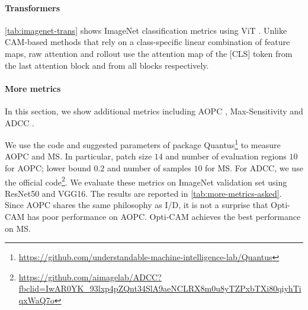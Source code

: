 

\paragraph{Transformers}

\autoref{tab:imagenet-trans} shows ImageNet classification metrics using ViT . 
Unlike CAM-based methods that rely on a class-specific linear combination of feature maps, 
raw attention \autocite{dosovitskiy2020image} and rollout \autocite{abnar2020quantifying} use the 
attention map of the [CLS] token from the last attention block and from all blocks respectively. 

\paragraph{More metrics}
In this section, we show additional metrics including AOPC \autocite{samek2016evaluating}, Max-Sensitivity
 \autocite{yeh2019fidelity} and ADCC \autocite{poppi2021revisiting}.

We use the code and suggested parameters of package 
Quantus\footnote{\url{https://github.com/understandable-machine-intelligence-lab/Quantus}} to measure AOPC 
and MS. In particular, patch size $14$ and number of evaluation regions $10$ for AOPC; lower bound $0.2$ 
and number of samples $10$ for MS.
For ADCC, we use the official 
code\footnote{\url{https://github.com/aimagelab/ADCC?fbclid=IwAR0YK_93lxp4pZQnt34SlA9aeNCLRX8m0u8yTZPxbTXi80qiyhTiqxWaQ7o}}.
We evaluate these metrics on ImageNet validation set using ResNet50 and VGG16. The results are 
reported in \autoref{tab:more-metrics-asked}. Since AOPC shares the same philosophy as I/D, it is 
not a surprise that Opti-CAM has poor performance on AOPC. Opti-CAM achieves the best performance on MS.


